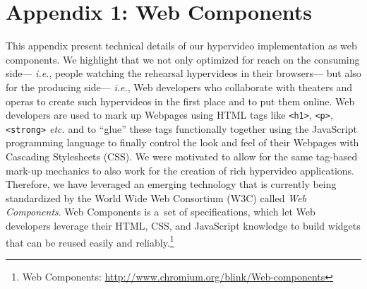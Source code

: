\documentclass[conference]{IEEEtran}
\newcommand{\todo}[1]{\noindent\textcolor{red}{{\bf \{ToDo} #1{\bf \}}}}
\begin{document}
\newpage

\section*{Appendix 1: Web Components}
This appendix present technical details of our hypervideo implementation as web components.
We highlight that we not only optimized for reach on the consuming side---%
\emph{i.e.}, people watching the rehearsal hypervideos in their browsers---%
but also for the producing side---%
\emph{i.e.}, Web developers who collaborate with theaters and operas
to create such hypervideos in the first place and to put them online.
Web developers are used to mark up Webpages using HTML tags
like \texttt{<h1>}, \texttt{<p>}, \texttt{<strong>} \emph{etc.}
and to ``glue'' these tags functionally together using the JavaScript programming language
to finally control the look and feel of their Webpages with Cascading Stylesheets (CSS).
We were motivated to allow for the same tag-based mark-up mechanics
to also work for the creation of rich hypervideo applications.
Therefore, we have leveraged an emerging technology
that is currently being standardized by the World Wide Web Consortium (W3C)
called \emph{Web Components}.
Web Components is a~set of specifications, which let Web developers leverage
their HTML, CSS, and JavaScript knowledge to build widgets
that can be reused easily and reliably.\footnote{Web Components:
\url{http://www.chromium.org/blink/Web-components}}

%
\end{document}
